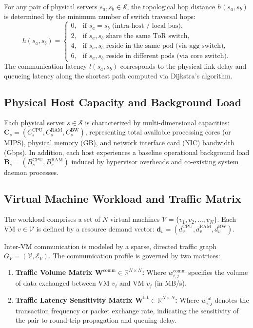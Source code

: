 \documentclass[conference]{IEEEtran}
\begin{document}
For any pair of physical servers $s_a, s_b \in \mathcal{S}$, the topological hop distance $h(s_a, s_b)$ is determined by the minimum number of switch traversal hops:
\begin{equation}
h(s_a, s_b) = 
\begin{cases}
0, & \text{if } s_a = s_b \text{ (intra-host / local bus)}, \\
2, & \text{if } s_a, s_b \text{ share the same ToR switch}, \\
4, & \text{if } s_a, s_b \text{ reside in the same pod (via agg switch)}, \\
6, & \text{if } s_a, s_b \text{ reside in different pods (via core switch)}.
\end{cases}
\end{equation}
The communication latency $l(s_a, s_b)$ corresponds to the physical link delay and queueing latency along the shortest path computed via Dijkstra's algorithm.

\subsection{Physical Host Capacity and Background Load}
Each physical server $s \in \mathcal{S}$ is characterized by multi-dimensional capacities:
$\mathbf{C}_s = \left( C_s^{\mathrm{CPU}}, C_s^{\mathrm{RAM}}, C_s^{\mathrm{BW}} \right)$,
representing total available processing cores (or MIPS), physical memory (GB), and network interface card (NIC) bandwidth (Gbps). In addition, each host experiences a baseline operational background load $\mathbf{B}_s = \left( B_s^{\mathrm{CPU}}, B_s^{\mathrm{RAM}} \right)$ induced by hypervisor overheads and co-existing system daemon processes.

\subsection{Virtual Machine Workload and Traffic Matrix}
The workload comprises a set of $N$ virtual machines $\mathcal{V} = \{v_1, v_2, \dots, v_N\}$. Each VM $v \in \mathcal{V}$ is defined by a resource demand vector:
$\mathbf{d}_v = \left( d_v^{\mathrm{CPU}}, d_v^{\mathrm{RAM}}, d_v^{\mathrm{BW}} \right)$.

Inter-VM communication is modeled by a sparse, directed traffic graph $G_V = (\mathcal{V}, \mathcal{E}_V)$. The communication profile is governed by two matrices:
\begin{enumerate}
    \item \textbf{Traffic Volume Matrix $\mathbf{W}^{\mathrm{comm}} \in \mathbb{R}^{N \times N}$:} Where $w_{i,j}^{\mathrm{comm}}$ specifies the volume of data exchanged between VM $v_i$ and VM $v_j$ (in MB/s).
    \item \textbf{Traffic Latency Sensitivity Matrix $\mathbf{W}^{\mathrm{lat}} \in \mathbb{R}^{N \times N}$:} Where $w_{i,j}^{\mathrm{lat}}$ denotes the transaction frequency or packet exchange rate, indicating the sensitivity of the pair to round-trip propagation and queuing delay.
\end{enumerate}
\end{document}
